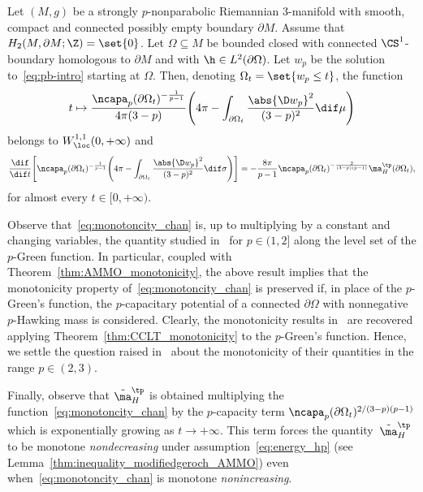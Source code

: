 \begin{Theorem}\label{thm:CCLT_monotonicity}
 Let $(M,g)$ be a strongly $p$-nonparabolic Riemannian $3$-manifold with smooth, compact and connected possibly empty boundary $\partial M$. Assume that $H_2(M, \partial M;\Z) = \set{0}$. Let $\Omega\subseteq M$ be bounded closed with connected $\CS^1$-boundary homologous to $\partial M$ and with $\h\in L^2(\partial \Omega)$. Let $w_p$ be the solution to~\eqref{eq:pb-intro} starting at $\Omega$. Then, denoting $\Omega_t = \set{w_p \leq t}$, the function
 \begin{equation}\label{eq:monotoncity_chan}
 t \mapsto \frac{\ncapa_p(\partial \Omega_t)^{-\frac{1}{p-1}}}{4\pi(3-p)}\Bigg( 4 \pi - \int_{\partial \Omega_t} \frac{\abs{\D w_p}^2}{(3-p)^2}\dif \mu\Bigg)
 \end{equation}
 belongs to $W^{1,1}_{\loc}(0,+\infty)$ and
 \begin{equation}\label{eq:weak_derivative}
 \frac{\dif}{\dif t}\Bigg[\ncapa_p(\partial \Omega_t)^{-\frac{1}{p-1}}\Bigg( 4 \pi - \int_{\partial \Omega_t} \frac{\abs{\D w_p}^2}{(3-p)^2}\dif \sigma\Bigg)\Bigg] =- \frac{8\pi}{p-1}\ncapa_p(\partial \Omega_t)^{-\frac{2}{(3-p)(p-1)}}\ma_{H}^{\tp}(\partial \Omega_t),
 \end{equation}
 for almost every $t \in [0,+\infty)$.
\end{Theorem}

\begin{Remark}\label{rmk:cclt_mon}
 Observe that~\eqref{eq:monotoncity_chan} is, up to multiplying by a constant and changing variables, the quantity studied in~\cite{chan_monotonicitygreenfunctions_2022,munteanu_comparisontheorems3dmanifolds_2023} for $p\in(1,2]$ along the level set of the $p$-Green function. In particular, coupled with Theorem~\ref{thm:AMMO_monotonicity}, the above result implies that the monotonicity property of~\eqref{eq:monotoncity_chan} is preserved if, in place of the $p$-Green's function, the $p$-capacitary potential of a connected $\partial \Omega$ with nonnegative $p$-Hawking mass is considered. Clearly, the monotonicity results in~\cite{chan_monotonicitygreenfunctions_2022, munteanu_comparisontheorems3dmanifolds_2023} are recovered applying Theorem~\ref{thm:CCLT_monotonicity} to the $p$-Green's function. Hence, we settle the question raised in~\cite{chan_monotonicitygreenfunctions_2022} about the monotonicity of their quantities in the range $p \in (2, 3)$.

 Finally, observe that $\tilde{\ma}^{\tp}_H$ is obtained multiplying the function~\eqref{eq:monotoncity_chan} by the $p$-capacity term $\ncapa_p(\partial \Omega_t)^{2/(3-p)(p-1)}$ which is exponentially growing as $t \to +\infty$. This term forces the quantity~$\tilde{\ma}^{\tp}_H$ to be monotone \emph{nondecreasing} under assumption~\eqref{eq:energy_hp} (see Lemma~\ref{thm:inequality_modifiedgeroch_AMMO}) even when~\eqref{eq:monotoncity_chan} is monotone \emph{nonincreasing}.
\end{Remark}


